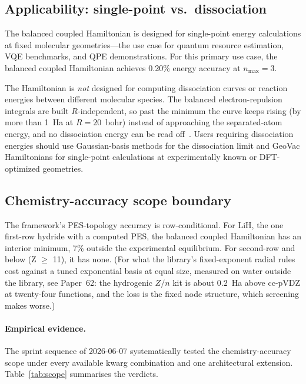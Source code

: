 \documentclass[twocolumn,pra,amsmath,amssymb,superscriptaddress]{revtex4-2}
\begin{document}
\subsection{Applicability: single-point vs.\ dissociation}
\label{sec:applicability}

The balanced coupled Hamiltonian is designed for single-point energy
calculations at fixed molecular geometries---the use case for quantum
resource estimation, VQE benchmarks, and QPE demonstrations.  For this
primary use case, the balanced coupled Hamiltonian achieves 0.20\%
energy accuracy at $n_{\max}=3$.

The Hamiltonian is \emph{not} designed for computing dissociation curves
or reaction energies between different molecular species.  The
balanced electron-repulsion integrals are built $R$-independent, so
past the minimum the curve keeps rising (by more than 1~Ha at
$R = 20$~bohr) instead of approaching the separated-atom energy, and no
dissociation energy can be read off~\cite{GeoVac_Paper19}.  Users
requiring dissociation energies should use Gaussian-basis methods for
the dissociation limit and GeoVac Hamiltonians for single-point
calculations at experimentally known or DFT-optimized geometries.

\subsection{Chemistry-accuracy scope boundary}
\label{subsec:scope_boundary}

The framework's PES-topology accuracy is row-conditional.  For LiH, the
one first-row hydride with a computed PES, the balanced coupled
Hamiltonian has an interior minimum, 7\% outside the experimental
equilibrium.  For second-row and below (Z $\ge$ 11), it has none.  (For what the
library's fixed-exponent radial rules cost against a tuned exponential
basis at equal size, measured on water outside the library, see
Paper~62: the hydrogenic $Z/n$ kit is about $0.2$~Ha above cc-pVDZ at
twenty-four functions, and the loss is the fixed node structure, which
screening makes worse.)

\paragraph{Empirical evidence.}  The sprint sequence of
2026-06-07 systematically
tested the chemistry-accuracy scope under every available kwarg
combination and one architectural extension.  Table~\ref{tab:scope}
summarises the verdicts.
\end{document}
